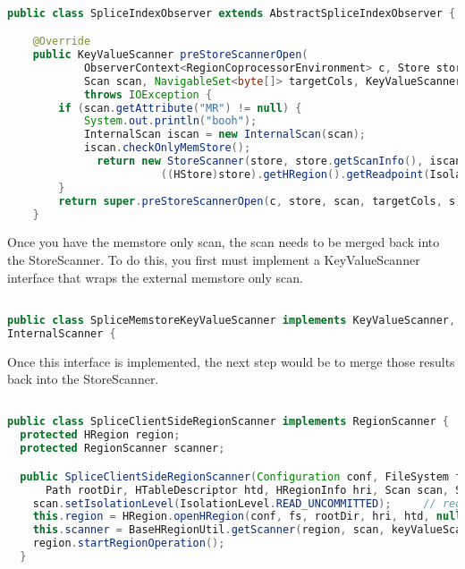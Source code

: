 \begin{lstlisting}[language=java]

public class SpliceIndexObserver extends AbstractSpliceIndexObserver {

	@Override
	public KeyValueScanner preStoreScannerOpen(
			ObserverContext<RegionCoprocessorEnvironment> c, Store store,
			Scan scan, NavigableSet<byte[]> targetCols, KeyValueScanner s)
			throws IOException {
		if (scan.getAttribute("MR") != null) {
			System.out.println("booh");
			InternalScan iscan = new InternalScan(scan);
			iscan.checkOnlyMemStore();
		      return new StoreScanner(store, store.getScanInfo(), iscan, targetCols,
		    	        ((HStore)store).getHRegion().getReadpoint(IsolationLevel.READ_UNCOMMITTED));		
		} 
		return super.preStoreScannerOpen(c, store, scan, targetCols, s);
	}
\end{lstlisting}

Once you have the memstore only scan, the scan needs to be merged back into the
StoreScanner.  To do this, you first must implement a KeyValueScanner interface
that wraps the external memstore only scan.

\begin{lstlisting}[language=java]

public class SpliceMemstoreKeyValueScanner implements KeyValueScanner,
InternalScanner {
\end{lstlisting}

Once this interface is implemented, the next step would be to merge those
results back into the StoreScanner.

\begin{lstlisting}[language=java]

public class SpliceClientSideRegionScanner implements RegionScanner {
  protected HRegion region;
  protected RegionScanner scanner;

  public SpliceClientSideRegionScanner(Configuration conf, FileSystem fs,
      Path rootDir, HTableDescriptor htd, HRegionInfo hri, Scan scan, ScanMetrics scanMetrics, List<KeyValueScanner> keyValueScanners) throws IOException {
    scan.setIsolationLevel(IsolationLevel.READ_UNCOMMITTED);     // region is immutable, set isolation level
    this.region = HRegion.openHRegion(conf, fs, rootDir, hri, htd, null, null, null);
    this.scanner = BaseHRegionUtil.getScanner(region, scan, keyValueScanners);
    region.startRegionOperation();
  }

\end{lstlisting}

